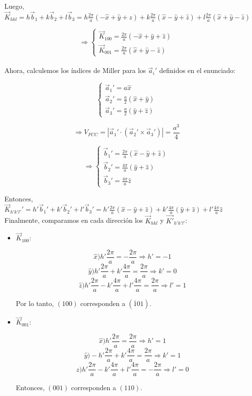 \documentclass[a4paper]{article}
\begin{document}
Luego, $\vec{K}_{hkl} = h\vec{b}_{1} + k\vec{b}_{2} + l\vec{b}_{3} = h\frac{2\pi}{a}(-\hat{x} + \hat{y} + \hat{z}) + k\frac{2\pi}{a}(\hat{x} - \hat{y} + \hat{z}) + l\frac{2\pi}{a}(\hat{x} + \hat{y} - \hat{z})$

$$\Rightarrow \begin{cases}
\vec{K}_{100} = \frac{2\pi}{a}(-\hat{x} + \hat{y} + \hat{z}) \\
\vec{K}_{001} = \frac{2\pi}{a}(\hat{x} + \hat{y} - \hat{z}) 
\end{cases}$$
\\

Ahora, calculemos los \'indices de Miller para los $\vec{a}_{i}'$ definidos en el enunciado:

$$\begin{cases}
\vec{a}_{1}' = a\hat{x}\\
\vec{a}_{2}' = \frac{a}{2} (\hat{x} + \hat{y}) \\
\vec{a}_{3}' = \frac{a}{2} (\hat{y} + \hat{z})
\end{cases}$$

$$\Rightarrow V_{FCC} = | \vec{a}_{1}' \cdot (\vec{a}_{2}' \times \vec{a}_{3}')| = \frac{a^{3}}{4} $$

$$\Rightarrow \begin{cases}
\vec{b}_{1}' = \frac{2\pi}{a}(\hat{x} - \hat{y} + \hat{z}) \\
\vec{b}_{2}' = \frac{4\pi}{a}(\hat{y} + \hat{z}) \\
\vec{b}_{3}' = \frac{4\pi}{a}\hat{z}
\end{cases}$$

Entonces, $\vec{K}_{h'k'l'}' = h'\vec{b}_{1}' + k'\vec{b}_{2}' + l'\vec{b}_{3}' = h'\frac{2\pi}{a}(\hat{x} - \hat{y} + \hat{z}) + k'\frac{4\pi}{a}(\hat{y} + \hat{z}) + l'\frac{4\pi}{a}\hat{z}$
\\

Finalmente, comparamos en cada direcci\'on los $\vec{K}_{hkl}$ y $\vec{K'}_{h'k'l'}$:

\begin{itemize}
\item $\vec{K}_{100}$:

$$ \hat{x}) h'\frac{2\pi}{a} = -\frac{2\pi}{a} \Rightarrow h' = -1$$
$$ \hat{y}) h'\frac{2\pi}{a} + k'\frac{4\pi}{a} = \frac{2\pi}{a} \Rightarrow k' = 0$$
$$ \hat{z}) h'\frac{2\pi}{a} - k'\frac{4\pi}{a} + l'\frac{4\pi}{a} = \frac{2\pi}{a} \Rightarrow l' = 1$$

Por lo tanto, $(100)$ corresponden a $(\overline{1}01)$.


\item $\vec{K}_{001}$:

$$ \hat{x}) h'\frac{2\pi}{a} = \frac{2\pi}{a} \Rightarrow h' = 1$$
$$ \hat{y}) -h'\frac{2\pi}{a} + k'\frac{4\pi}{a} = \frac{2\pi}{a} \Rightarrow k' = 1$$
$$ \hat{z}) h'\frac{2\pi}{a} - k'\frac{4\pi}{a} + l'\frac{4\pi}{a} = -\frac{2\pi}{a} \Rightarrow l' = 0$$

Entonces, $(001)$ corresponden a $(110)$.

\end{itemize}
\end{document}
